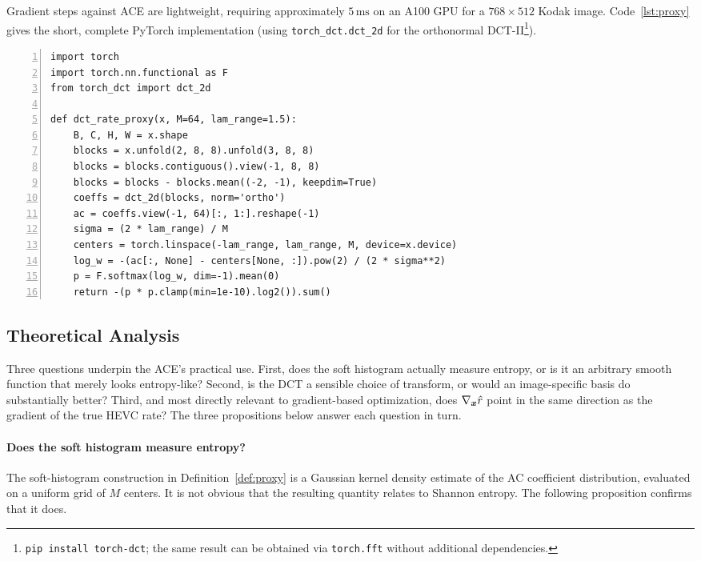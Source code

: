Gradient steps against ACE are lightweight, requiring approximately $5\,\text{ms}$ on an A100 GPU for a $768\times512$ Kodak image.
Code~\ref{lst:proxy} gives the short, complete PyTorch implementation (using \texttt{torch\_dct.dct\_2d} for the orthonormal DCT-II\footnote{\texttt{pip install torch-dct}; the same result can be obtained via \texttt{torch.fft} without additional dependencies.}).

\begin{tcolorbox}[
    left=0mm, right=0mm, top=0mm, bottom=-1mm,
    title=Code \ref{lst:proxy},
    label={lst:proxy}
]
\begin{lstlisting}[numbers=left, xleftmargin=2em, numbersep=1em, frame=none]
import torch
import torch.nn.functional as F
from torch_dct import dct_2d

def dct_rate_proxy(x, M=64, lam_range=1.5):
    B, C, H, W = x.shape
    blocks = x.unfold(2, 8, 8).unfold(3, 8, 8)
    blocks = blocks.contiguous().view(-1, 8, 8)
    blocks = blocks - blocks.mean((-2, -1), keepdim=True)
    coeffs = dct_2d(blocks, norm='ortho')
    ac = coeffs.view(-1, 64)[:, 1:].reshape(-1)
    sigma = (2 * lam_range) / M
    centers = torch.linspace(-lam_range, lam_range, M, device=x.device)
    log_w = -(ac[:, None] - centers[None, :]).pow(2) / (2 * sigma**2)
    p = F.softmax(log_w, dim=-1).mean(0)
    return -(p * p.clamp(min=1e-10).log2()).sum()
\end{lstlisting}
\end{tcolorbox}

\subsection{Theoretical Analysis}
\label{sec:theory}

Three questions underpin the ACE's practical use.
First, does the soft histogram actually measure entropy, or is it an arbitrary smooth function that merely looks entropy-like?
Second, is the DCT a sensible choice of transform, or would an image-specific basis do substantially better?
Third, and most directly relevant to gradient-based optimization, does $\nabla_{\boldsymbol{x}}\hat{r}$ point in the same direction as the gradient of the true HEVC rate?
The three propositions below answer each question in turn.

\paragraph{Does the soft histogram measure entropy?}
The soft-histogram construction in Definition~\ref{def:proxy} is a Gaussian kernel density estimate of the AC coefficient distribution, evaluated on a uniform grid of $M$ centers.
It is not obvious that the resulting quantity relates to Shannon entropy.
The following proposition confirms that it does.

